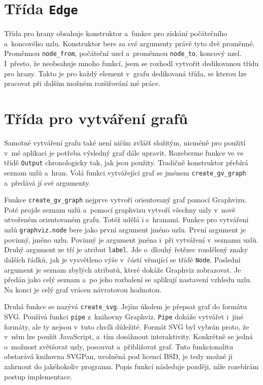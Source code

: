 \documentclass[color,table,oneside,nolot,nolof]{fithesis}
\begin{document}
\section{Třída \texttt{Edge}}
	Třída pro hrany obsahuje konstruktor a~funkce pro získání počátečního a~koncového uzlu. Konstruktor bere za své argumenty právě tyto dvě 
	proměnné. Proměnnou \texttt{node\_from}, počáteční uzel a~proměnnou \texttt{node\_to}, koncový uzel. I~přesto, že neobsahuje mnoho funkcí, jsem se rozhodl vytvořit dedikovanou třídu pro hrany. 
	Takto je pro každý element v~grafu dedikovaná třída, se kterou lze pracovat při dalším možném rozšiřování mé práce.

\section{Třída pro vytváření grafů}
	Samotné vytváření grafu také není ničím zvlášť složitým, nicméně pro použití v~mé aplikaci je potřeba výsledný graf dále upravit. Rozeberme funkce ve ve třídě \texttt{Output} chronologicky
	tak, jak jsou použity. Tradičně konstruktor přebírá seznam uzlů a~hran. Volá funkci vytvářející graf se jménem \texttt{create\_gv\_graph} a~předává jí své argumenty. 

	Funkce \texttt{create\_gv\_graph} nejprve vytvoří orientovaný graf pomocí Graphvizu. Poté projde seznam uzlů a~pomocí graphvizu vytvoří všechny uzly v~nově utvořeném orientovaném grafu. Totéž udělá i
	s~hranami. Funkce pro vytváření uzlů \texttt{graphviz.node} bere jako první argument jméno uzlu. První argument je povinný, jméno uzlu. Povinný je argument jména
	i~při vytváření v~seznamu uzlů. Druhý argument ze tří je atribut \texttt{label}. Jde o~dlouhý řetězec rozdělený znaky dalších řádků, jak je vysvětleno výše v~částí věnující se třídě \texttt{Node}.
	Poslední argument je seznam zbylých atributů, které dokáže Graphviz zobrazovat. Je předán jako celý seznam a~po jeho rozbalení se aplikují nastavení vzhledu uzlu. Na konci je celý
	graf vrácen návratovou hodnotou.

	Druhá funkce se nazývá \texttt{create\_svg}. Jejím úkolem je přepsat graf do formátu SVG. Používá funkci \texttt{pipe} z~knihovny Graphviz. \texttt{Pipe} dokáže vytvářet i~jiné formáty, ale ty nejsou v~tuto
	chvíli důležité. Formát SVG byl vybrán proto, že v~něm lze použít JavaScript\cite{svg}, a~tím dosáhnout interaktivity. Konkrétně se jedná o~možnost zvětšovat uzly, posouvat a~přibližovat graf.
	Tuto funkcionalitu obstarává knihovna SVGPan\cite{svgpan}, uvolněná pod licencí BSD, je tedy možné ji zahrnout do jakéhokoliv programu.
	Popis funkcí následuje později, níže rozebírám postup implementace.
\end{document}

